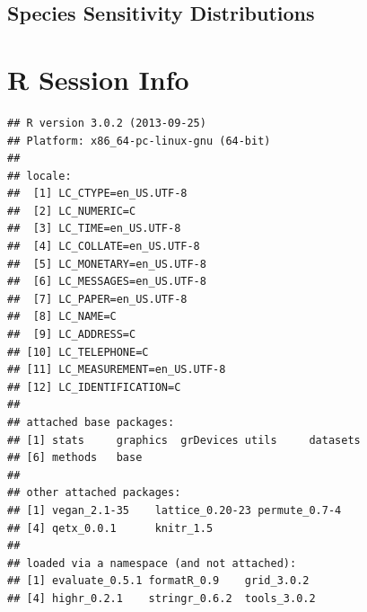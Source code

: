 \documentclass{tufte-book}\usepackage{knitr}
\begin{document}
\section{Species Sensitivity Distributions}



\backmatter
\appendix

\chapter{R Session Info}
\begin{knitrout}
\color{fgcolor}\begin{kframe}
\begin{alltt}
\hlstd{()}
\end{alltt}
\begin{verbatim}
## R version 3.0.2 (2013-09-25)
## Platform: x86_64-pc-linux-gnu (64-bit)
## 
## locale:
##  [1] LC_CTYPE=en_US.UTF-8      
##  [2] LC_NUMERIC=C              
##  [3] LC_TIME=en_US.UTF-8       
##  [4] LC_COLLATE=en_US.UTF-8    
##  [5] LC_MONETARY=en_US.UTF-8   
##  [6] LC_MESSAGES=en_US.UTF-8   
##  [7] LC_PAPER=en_US.UTF-8      
##  [8] LC_NAME=C                 
##  [9] LC_ADDRESS=C              
## [10] LC_TELEPHONE=C            
## [11] LC_MEASUREMENT=en_US.UTF-8
## [12] LC_IDENTIFICATION=C       
## 
## attached base packages:
## [1] stats     graphics  grDevices utils     datasets 
## [6] methods   base     
## 
## other attached packages:
## [1] vegan_2.1-35    lattice_0.20-23 permute_0.7-4  
## [4] qetx_0.0.1      knitr_1.5      
## 
## loaded via a namespace (and not attached):
## [1] evaluate_0.5.1 formatR_0.9    grid_3.0.2    
## [4] highr_0.2.1    stringr_0.6.2  tools_3.0.2
\end{verbatim}
\end{kframe}
\end{knitrout}




\begin{fullwidth}

\end{fullwidth}

\printindex
\end{document}
